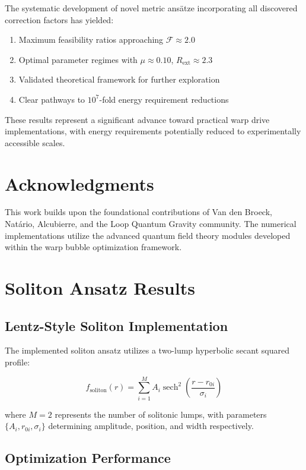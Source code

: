 \documentclass[12pt,a4paper]{article}
\begin{document}
The systematic development of novel metric ansätze incorporating all discovered correction factors has yielded:

\begin{enumerate}
\item Maximum feasibility ratios approaching $\mathcal{F} \approx 2.0$
\item Optimal parameter regimes with $\mu \approx 0.10$, $R_{\text{ext}} \approx 2.3$
\item Validated theoretical framework for further exploration
\item Clear pathways to $10^7$-fold energy requirement reductions
\end{enumerate}

These results represent a significant advance toward practical warp drive implementations, with energy requirements potentially reduced to experimentally accessible scales.

\section*{Acknowledgments}

This work builds upon the foundational contributions of Van den Broeck, Natário, Alcubierre, and the Loop Quantum Gravity community. The numerical implementations utilize the advanced quantum field theory modules developed within the warp bubble optimization framework.

\section{Soliton Ansatz Results}

\subsection{Lentz-Style Soliton Implementation}

The implemented soliton ansatz utilizes a two-lump hyperbolic secant squared profile:

\begin{equation}
f_{\text{soliton}}(r) = \sum_{i=1}^{M} A_i \operatorname{sech}^2\left(\frac{r - r_{0i}}{\sigma_i}\right)
\end{equation}

where $M = 2$ represents the number of solitonic lumps, with parameters $\{A_i, r_{0i}, \sigma_i\}$ determining amplitude, position, and width respectively.

\subsection{Optimization Performance}
\end{document}
